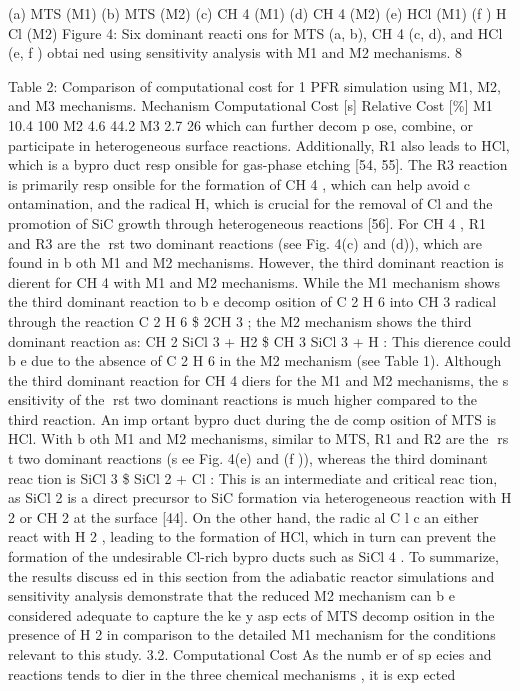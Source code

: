 \documentclass[10pt, letterpaper]{article}
\begin{document}
(a) MTS (M1)
(b) MTS (M2)
(c) CH
4
(M1)
(d) CH
4
(M2)
(e) HCl (M1)
(f ) H Cl (M2)
Figure 4: Six dominant reacti ons for MTS (a, b), CH
4
(c, d), and HCl (e, f ) obtai ned using sensitivity analysis with M1 and
M2 mechanisms.
8


Table 2: Comparison of computational cost for 1 PFR simulation using M1, M2, and M3 mechanisms.
Mechanism
Computational Cost [s]
Relative Cost [\%]
M1
10.4
100
M2
4.6
44.2
M3
2.7
26
which can further decom p ose, combine, or participate in heterogeneous surface reactions. Additionally,
R1 also leads to HCl, which is a bypro duct resp onsible for gas-phase etching [54, 55]. The R3 reaction is
primarily resp onsible for the formation of CH
4
, which can help avoid c ontamination, and the radical H,
which is crucial for the removal of Cl and the promotion of SiC growth through heterogeneous reactions [56].
For CH
4
, R1 and R3 are the rst two dominant reactions (see Fig. 4(c) and (d)), which are found in
b oth M1 and M2 mechanisms. However, the third dominant reaction is dierent for CH
4
with M1 and M2
mechanisms. While the M1 mechanism shows the third dominant reaction to b e decomp osition of C
2
H
6
into
CH
3
radical through the reaction
C
2
H
6
\$
2CH
3
;
the M2 mechanism shows the third dominant reaction as:
CH
2
SiCl
3
+ H2
\$
CH
3
SiCl
3
+ H
:
This dierence could b e due to the absence of C
2
H
6
in the M2 mechanism (see Table 1). Although the third
dominant reaction for CH
4
diers for the M1 and M2 mechanisms, the s ensitivity of the rst two dominant
reactions is much higher compared to the third reaction.
An imp ortant bypro duct during the de comp osition of MTS is HCl. With b oth M1 and M2 mechanisms,
similar to MTS, R1 and R2 are the rs t two dominant reactions (s ee Fig. 4(e) and (f )), whereas the third
dominant reac tion is
SiCl
3
\$
SiCl
2
+ Cl
:
This is an intermediate and critical reac tion, as SiCl
2
is a direct precursor to SiC formation via heterogeneous
reaction with H
2
or CH
2
at the surface [44]. On the other hand, the radic al C l c an either react with H
2
,
leading to the formation of HCl, which in turn can prevent the formation of the undesirable Cl-rich bypro ducts
such as SiCl
4
.
To summarize, the results discuss ed in this section from the adiabatic reactor simulations and sensitivity
analysis demonstrate that the reduced M2 mechanism can b e considered adequate to capture the ke y asp ects
of MTS decomp osition in the presence of H
2
in comparison to the detailed M1 mechanism for the conditions
relevant to this study.
3.2. Computational Cost
As the numb er of sp ecies and reactions tends to dier in the three chemical mechanisms , it is exp ected
\end{document}
